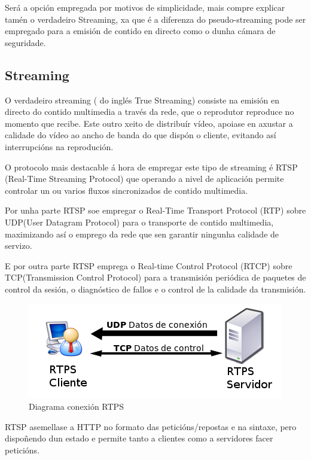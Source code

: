 		Será a opción empregada por motivos de simplicidade, mais compre explicar tamén o verdadeiro 
		Streaming, xa que é a diferenza do pseudo-streaming pode ser empregado para a emisión de
		contido en directo como o dunha cámara de seguridade.
		
	\subsection{Streaming}
		O verdadeiro streaming ( do inglés True Streaming) consiste na emisión en directo do 
		contido multimedia a través da rede, que o reprodutor reproduce no momento que recibe.
		Este outro xeito de distribuír vídeo, apoiase en axustar a calidade do vídeo ao ancho de
		banda do que dispón o cliente, evitando así interrupcións na reprodución.
		
		O protocolo mais destacable á hora de empregar este tipo de streaming é RTSP (Real-Time
		Streaming Protocol) que operando a nivel de aplicación permite controlar un ou varios fluxos 
		sincronizados de contido multimedia.
		
		Por unha parte RTSP soe empregar o Real-Time Transport Protocol (RTP) sobre UDP(User 
		Datagram Protocol) para o transporte de contido multimedia, maximizando así o emprego 
		da rede que sen garantir ningunha calidade de servizo.
		
		E por outra parte RTSP emprega o Real-time Control Protocol (RTCP) sobre TCP(Transmission 
		Control Protocol) para a transmisión periódica de paquetes de control da sesión, o
		diagnóstico de fallos e o control de la calidade da transmisión.
		
		\begin{figure}[htp]
		\begin{center}
			\includegraphics[scale=0.6]{figures/RTPS-diagram.png}
			\caption{Diagrama conexión RTPS}
		\label{fig:ArquitecturaAppWeb}
		\end{center}
		\end{figure}
		
		RTSP asemellase a HTTP no formato das peticións/repostas e na sintaxe, pero dispoñendo 
		dun estado e permite tanto a clientes como a servidores facer peticións.

